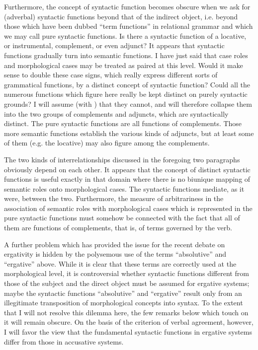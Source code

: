 Furthermore, the concept of syntactic function becomes obscure when we ask for (adverbal) syntactic functions beyond that of the indirect object, i.e. beyond those which have been dubbed ``term functions'' in relational grammar and which we may call pure syntactic functions. Is there a syntactic function of a locative, or instrumental, complement, or even adjunct? It appears that syntactic functions gradually turn into semantic functions. I have just said that case roles and morphological cases may be treated as paired at this level. Would it make sense to double these case signs, which really express different sorts of grammatical functions, by a distinct concept of syntactic function? Could all the numerous functions which figure here really be kept distinct on purely syntactic grounds? I will assume (with \citealt[17--21]{Matthews1981}) that they cannot, and will therefore collapse them into the two groups of complements and adjuncts, which are syntactically distinct. The pure syntactic functions are all functions of complements. Those more semantic functions establish the various kinds of adjuncts, but at least some of them (e.g. the locative) may also figure among the complements.

The two kinds of interrelationships discussed in the foregoing two paragraphs obviously depend on each other. It appears that the concept of distinct syntactic functions is useful exactly in that domain where there is no biunique mapping of semantic roles onto morphological cases. The syntactic functions mediate, as it were, between the two. Furthermore, the measure of arbitrariness in the association of semantic roles with morphological cases which is represented in the pure syntactic functions must somehow be connected with the fact that all of them are functions of complements, that is, of terms governed by the verb.

A further problem which has provided the issue for the recent debate on ergativity is hidden by the polysemous use of the terms ``absolutive'' and ``ergative'' above. While it is clear that these terms are correctly used at the morphological level, it is controversial whether syntactic functions different from those of the subject and the direct object must be assumed for ergative systems; maybe the syntactic functions ``absolutive'' and ``ergative'' result only from an illegitimate transposition of morphological concepts into syntax. To the extent that I will not resolve this dilemma here, the few remarks below which touch on it will remain obscure. On the basis of the criterion of verbal agreement, however, I will favor the view that the fundamental syntactic functions in ergative systems differ from those in accusative systems.

